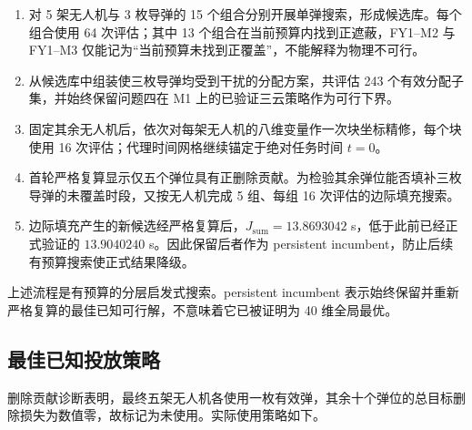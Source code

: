 \begin{enumerate}
\item 对 5 架无人机与 3 枚导弹的 15 个组合分别开展单弹搜索，形成候选库。每个组合使用 64 次评估；其中 13 个组合在当前预算内找到正遮蔽，FY1–M2 与 FY1–M3 仅能记为“当前预算未找到正覆盖”，不能解释为物理不可行。
\item 从候选库中组装使三枚导弹均受到干扰的分配方案，共评估 243 个有效分配子集，并始终保留问题四在 M1 上的已验证三云策略作为可行下界。
\item 固定其余无人机后，依次对每架无人机的八维变量作一次块坐标精修，每个块使用 16 次评估；代理时间网格继续锚定于绝对任务时间 $t=0$。
\item 首轮严格复算显示仅五个弹位具有正删除贡献。为检验其余弹位能否填补三枚导弹的未覆盖时段，又按无人机完成 5 组、每组 16 次评估的边际填充搜索。
\item 边际填充产生的新候选经严格复算后，$J_{\mathrm{sum}}=13.8693042$ s，低于此前已经正式验证的 $13.9040240$ s。因此保留后者作为 persistent incumbent，防止后续有预算搜索使正式结果降级。
\end{enumerate}

上述流程是有预算的分层启发式搜索。persistent incumbent 表示始终保留并重新严格复算的最佳已知可行解，不意味着它已被证明为 40 维全局最优。

\subsection{最佳已知投放策略}

删除贡献诊断表明，最终五架无人机各使用一枚有效弹，其余十个弹位的总目标删除损失为数值零，故标记为未使用。实际使用策略如下。

